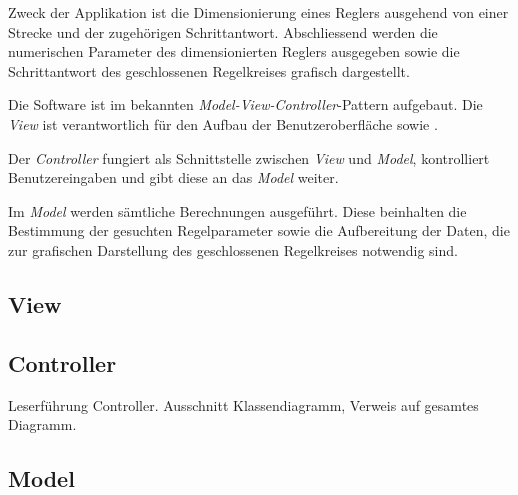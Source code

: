 
Zweck  der Applikation  ist die  Dimensionierung eines  Reglers ausgehend  von
einer  Strecke  und  der  zugeh\"origen  Schrittantwort. Abschliessend  werden
die  numerischen Parameter  des dimensionierten  Reglers ausgegeben  sowie die
Schrittantwort des geschlossenen Regelkreises grafisch dargestellt.


Die   Software    ist   im    bekannten   \emph{Model-View-Controller}-Pattern
aufgebaut. Die   \emph{View}  ist   verantwortlich   f\"ur   den  Aufbau   der
Benutzeroberfl\"ache sowie .

Der  \emph{Controller} fungiert  als  Schnittstelle  zwischen \emph{View}  und
\emph{Model}, kontrolliert Benutzereingaben und gibt diese an das \emph{Model}
weiter.

Im \emph{Model} werden s\"amtliche Berechnungen ausgef\"uhrt. Diese beinhalten
die Bestimmung der gesuchten Regelparameter  sowie die Aufbereitung der Daten,
die zur grafischen Darstellung des geschlossenen Regelkreises notwendig sind.


\subsection{View}



\subsection{Controller}


Leserf\"uhrung Controller.
Ausschnitt Klassendiagramm, Verweis auf gesamtes Diagramm.




\subsection{Model}

